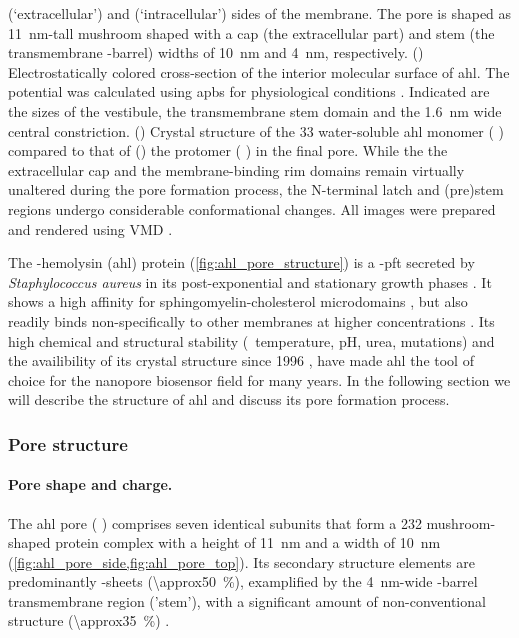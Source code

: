 \begin{figure*}[p]
{  \cisi{}  (`extracellular') and \transi{} (`intracellular') sides of the membrane. The pore is shaped as
  \SI{11}{\nm}-tall mushroom shaped with a cap (\ie the extracellular part) and stem (\ie the transmembrane
  \tb-barrel) widths of \SI{10}{\nm} and \SI{4}{\nm}, respectively.
  ()
  Electrostatically colored cross-section of the interior molecular surface of \gls{ahl}. The potential was
  calculated using \gls{apbs} for physiological conditions \cite{Baker-2001,Baker-2005}. Indicated are the
  sizes of the \cisi{} vestibule, the transmembrane stem domain and the \SI{1.6}{\nm} wide central
  constriction.
  ()
  Crystal structure of the \SI{33}{\kDa} water-soluble \gls{ahl} monomer ( \cite{Sugawara-2015})
  compared to that of
  ()
  the protomer ( \cite{Song-1996}) in the final pore. While the the extracellular cap and the
  membrane-binding rim domains remain virtually unaltered during the pore formation process, the N-terminal
  latch and (pre)stem regions undergo considerable conformational changes. 
  All images were prepared and rendered using VMD \cite{Humphrey-1996,Stone-1998}.
  }\label{fig:ahl_pore_structure}
\end{figure*}

The \textalpha-hemolysin (\gls{ahl}) protein (\cref{fig:ahl_pore_structure}) is a \tb-\gls{pft} secreted by
\textit{Staphylococcus aureus} in its post-exponential and stationary growth phases \cite{Bhakdi-1991}. It
shows a high affinity for sphingomyelin-cholesterol microdomains \cite{Menestrina-2001,Valeva-2006}, but also
readily binds non-specifically to other membranes at higher concentrations \cite{Hildebrand-1991}. Its high
chemical and structural stability (\eg~temperature, pH, urea, mutations) and the availibility of its crystal
structure since 1996 \cite{Song-1996}, have made \gls{ahl} the tool of choice for the nanopore biosensor field
for many years. In the following section we will describe the structure of \gls{ahl} and discuss its pore
formation process.

\subsubsection{Pore structure}

\paragraph{Pore shape and charge.}
%
The \gls{ahl} pore ( \cite{Song-1996}) comprises seven identical subunits that form a
\SI{232}{\kDa} mushroom-shaped protein complex with a height of \SI{11}{\nm} and a width of \SI{10}{\nm}
(\cref{fig:ahl_pore_side,fig:ahl_pore_top}). Its secondary structure elements are predominantly \tb-sheets
(\SI{\approx50}{\percent}), examplified by the \SI{4}{\nm}-wide \tb-barrel transmembrane region ('stem'), with
a significant amount of non-conventional structure (\SI{\approx35}{\percent}) \cite{Song-1996}.

